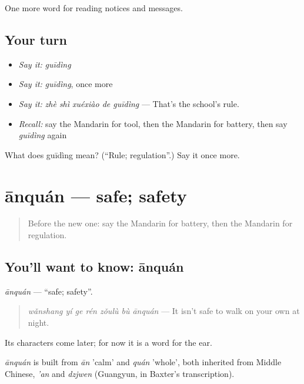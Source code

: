 \begin{grammarlens}[title={What you've built}]
One more word for reading notices and messages.
\end{grammarlens}

\subsection*{Your turn}
\begin{itemize}
\raggedright
  \item \emph{Say it:} \emph{guīdìng}
  \item \emph{Say it:} \emph{guīdìng}, once more
  \item \emph{Say it:} \emph{zhè shì xuéxiào de guīdìng} — That's the school's rule.
  \item \emph{Recall:} say the Mandarin for tool, then the Mandarin for battery, then say \emph{guīdìng} again
\end{itemize}

\begin{tcolorbox}[breakable,colback=teal!4,colframe=teal!35!black,title={Before you move on}]
What does guīdìng mean? (\textquotedblleft{}Rule; regulation\textquotedblright{}.) Say it once more.
\end{tcolorbox}
\section[ānquán]{ānquán — safe; safety}

\label{lesson:ZH-C209-anquan}



\begin{quote}
Before the new one: say the Mandarin for battery, then the Mandarin for regulation.
\end{quote}

\subsection*{You'll want to know: ānquán}
\emph{ānquán} — \textquotedblleft{}safe; safety\textquotedblright{}.

\begin{quote}
\emph{wǎnshang yí ge rén zǒulù bù ānquán} — It isn't safe to walk on your own at night.
\end{quote}

Its characters come later; for now it is a word for the ear.

\begin{cousinweb}
\emph{ānquán} is built from \emph{ān} 'calm' and \emph{quán} 'whole', both inherited from Middle Chinese, \emph{'an} and \emph{dzjwen} (Guangyun, in Baxter's transcription).
\end{cousinweb}

